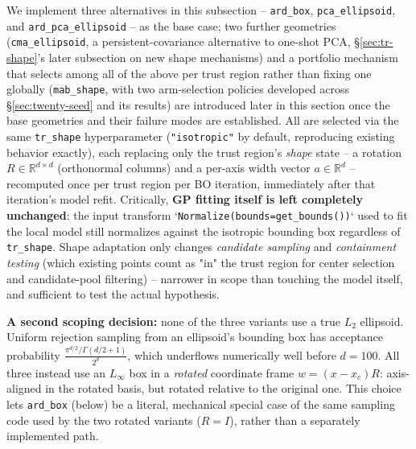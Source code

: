 \documentclass[11pt]{article}
\begin{document}
We implement three alternatives in this subsection --
\texttt{ard\_box}, \texttt{pca\_ellipsoid}, and \texttt{ard\_pca\_ellipsoid}
-- as the base case; two further geometries
(\texttt{cma\_ellipsoid}, a persistent-covariance alternative to
one-shot PCA, \S\ref{sec:tr-shape}'s later subsection on new shape
mechanisms) and a portfolio mechanism that selects among all of the above
per trust region rather than fixing one globally
(\texttt{mab\_shape}, with two arm-selection policies developed across
\S\ref{sec:twenty-seed} and its results) are introduced later in this
section once the base geometries and their failure modes are established.
All are selected via the same \texttt{tr\_shape} hyperparameter
(\texttt{"isotropic"} by default, reproducing existing behavior exactly),
each replacing only the trust region's \emph{shape} state -- a rotation
$R \in \mathbb{R}^{d \times d}$ (orthonormal columns) and a per-axis width
vector $a \in \mathbb{R}^d$ -- recomputed once per trust region per BO
iteration, immediately after that iteration's model refit.
Critically, \textbf{GP fitting itself is left completely unchanged}: the
input transform `\texttt{Normalize(bounds=get\_bounds())}` used to fit the
local model still normalizes against the isotropic bounding box regardless
of \texttt{tr\_shape}. Shape adaptation only changes \emph{candidate
sampling} and \emph{containment testing} (which existing points count as
"in" the trust region for center selection and candidate-pool filtering)
-- narrower in scope than touching the model itself, and sufficient to test
the actual hypothesis.

\textbf{A second scoping decision:} none of the three variants use a true
$L_2$ ellipsoid. Uniform rejection sampling from an ellipsoid's bounding
box has acceptance probability $\frac{\pi^{d/2}/\Gamma(d/2+1)}{2^d}$, which
underflows numerically well before $d=100$. All three instead use an
$L_\infty$ box in a \emph{rotated} coordinate frame
$w = (x - x_c)R$: axis-aligned in the rotated basis, but rotated relative
to the original one. This choice lets \texttt{ard\_box} (below) be a
literal, mechanical special case of the same sampling code used by the two
rotated variants ($R = I$), rather than a separately implemented path.
\end{document}
